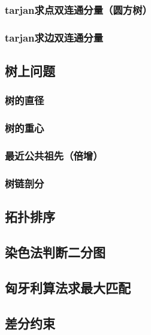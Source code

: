 \documentclass[10pt,a4paper]{article}
\begin{document}
\subsubsection{tarjan求点双连通分量（圆方树）}

\subsubsection{tarjan求边双连通分量}

\subsection{树上问题}
\subsubsection{树的直径}

\subsubsection{树的重心}

\subsubsection{最近公共祖先（倍增）}

\subsubsection{树链剖分}

\subsection{拓扑排序}

\subsection{染色法判断二分图}

\subsection{匈牙利算法求最大匹配}

\subsection{差分约束}
\begin{spacing}{1.5}

\end{spacing}

\end{document}
